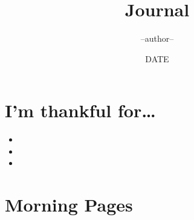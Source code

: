 \documentclass[letterpaper,twoside]{article}
\title{Journal}
\author{--author--}
\date{DATE}
\begin{document}
\maketitle

\part*{I'm thankful for\ldots~}
\begin{itemize}
	\item
	\item
	\item
\end{itemize}

\part*{Morning Pages}
\end{document}
